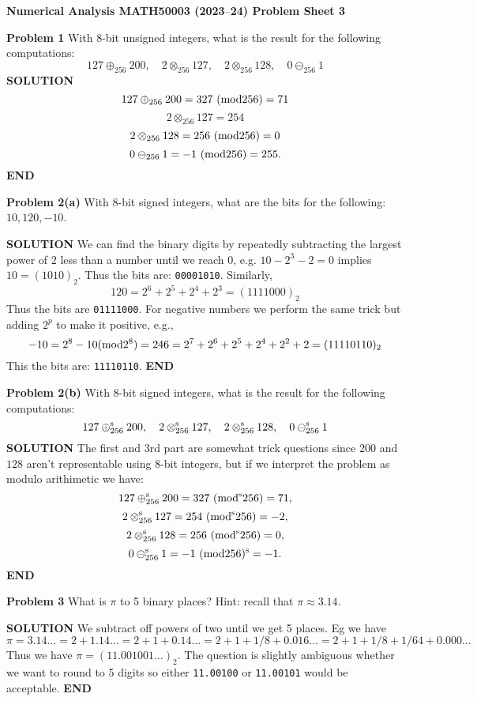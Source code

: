 \documentclass[12pt,a4paper]{article}
\def\endash{–}
\begin{document}
\textbf{Numerical Analysis MATH50003 (2023\ensuremath{\endash}24) Problem Sheet 3}

\textbf{Problem 1} With 8-bit unsigned integers, what is the result for the following computations:
\[
127 \ensuremath{\oplus}_{256} 200,\quad 2 \ensuremath{\otimes}_{256} 127,\quad 2 \ensuremath{\otimes}_{256} 128, \quad 0 \ensuremath{\ominus}_{256} 1
\]
\textbf{SOLUTION}
\[
127 \ensuremath{\oplus}_{256} 200 = 327\ ({\rm mod} 256) = 71
\]
\[
2 \ensuremath{\otimes}_{256} 127 = 254
\]
\[
2 \ensuremath{\otimes}_{256} 128 = 256 \ ({\rm mod} 256) = 0
\]
\[
0 \ensuremath{\ominus}_{256} 1 = -1  \ ({\rm mod} 256) = 255.
\]
\textbf{END}

\textbf{Problem 2(a)} With 8-bit signed integers, what are the bits for the following: $10, 120, -10$.

\textbf{SOLUTION} We can find the binary digits by repeatedly subtracting the largest power of 2 less than a number until we reach 0, e.g. $10 - 2^3 - 2 = 0$ implies $10 = (1010)_2$. Thus the bits are: \texttt{00001010}. Similarly,
\[
120 = 2^6 + 2^5 + 2^4 + 2^3 = (1111000)_2
\]
Thus the bits are \texttt{01111000}. For negative numbers we perform the same trick but adding $2^p$ to make it positive, e.g.,
\[
-10 = 2^8 - 10 ({\rm mod 2^8}) = 246 = 2^7 + 2^6 + 2^5 + 2^4 + 2^2 + 2 = (11110110)_2
\]
This the bits are: \texttt{11110110}. \textbf{END}

\textbf{Problem 2(b)} With 8-bit signed integers, what is the result for the following computations:
\[
127 \ensuremath{\oplus}_{256}^{\rm s} 200,\quad 2 \ensuremath{\otimes}_{256}^{\rm s} 127, \quad 2 \ensuremath{\otimes}_{256}^{\rm s} 128, \quad 0 \ensuremath{\ominus}_{256}^{\rm s} 1
\]
\textbf{SOLUTION} The first and 3rd part are somewhat trick questions since $200$ and $128$ aren't representable using 8-bit integers, but if we interpret the problem as modulo arithimetic we have:
\[
127 \ensuremath{\oplus}_{256}^{\rm s} 200 = 327\ ({\rm mod}^{\rm s} 256) = 71,
\]
\[
2 \ensuremath{\otimes}_{256}^{\rm s} 127 = 254\ ({\rm mod}^{\rm s} 256) = -2,
\]
\[
2 \ensuremath{\otimes}_{256}^{\rm s} 128 = 256 \ ({\rm mod}^{\rm s} 256) = 0,
\]
\[
0 \ensuremath{\ominus}_{256}^{\rm s} 1 = -1  \ ({\rm mod} 256)^{\rm s} = -1.
\]
\textbf{END}

\textbf{Problem 3} What is $\ensuremath{\pi}$ to 5 binary places? Hint: recall that $\ensuremath{\pi} \ensuremath{\approx} 3.14$.

\textbf{SOLUTION} We subtract off powers of two until we get 5 places. Eg we have
\[
\ensuremath{\pi} = 3.14\ensuremath{\ldots} = 2 + 1.14\ensuremath{\ldots} = 2 + 1 + 0.14\ensuremath{\ldots} = 2 + 1 + 1/8 + 0.016\ensuremath{\ldots} = 2 + 1 + 1/8  + 1/64  + 0.000\ensuremath{\ldots}
\]
Thus we have $\ensuremath{\pi} = (11.001001\ensuremath{\ldots})_2$. The question is slightly ambiguous whether we want to round to 5 digits so either \texttt{11.00100} or \texttt{11.00101} would be acceptable. \textbf{END}
\end{document}
